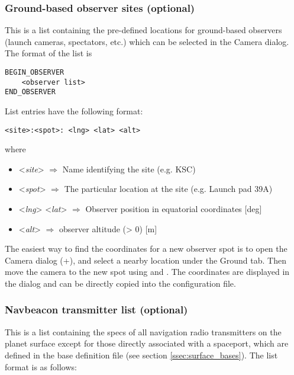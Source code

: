 \documentclass[Orbiter Developer Manual.tex]{subfiles}
\begin{document}
\subsubsection*{Ground-based observer sites (optional)}
This is a list containing the pre-defined locations for ground-based observers (launch cameras, spectators, etc.) which can be selected in the Camera dialog. The format of the list is

\begin{lstlisting}[language=OSFS]
BEGIN_OBSERVER
	<observer list>
END_OBSERVER
\end{lstlisting}

\noindent
List entries have the following format:

\begin{lstlisting}[language=OSFS]
<site>:<spot>: <lng> <lat> <alt>
\end{lstlisting}

\noindent
where

\begin{itemize}
\item <\textit{site}> $\Rightarrow$ Name identifying the site (e.g. KSC)
\item <\textit{spot}> $\Rightarrow$ The particular location at the site (e.g. Launch pad 39A)
\item <\textit{lng}> <\textit{lat}> $\Rightarrow$ Observer position in equatorial coordinates [deg]
\item <\textit{alt}> $\Rightarrow$ observer altitude (> 0) [m]
\end{itemize}

\noindent
The easiest way to find the coordinates for a new observer spot is to open the Camera dialog (\Ctrl+), and select a nearby location under the Ground tab. Then move the camera to the new spot using \Ctrl\DArrow\UArrow\RArrow\LArrow and . The coordinates are displayed in the dialog and can be directly copied into the configuration file.


\subsubsection*{Navbeacon transmitter list (optional)}
This is a list containing the specs of all navigation radio transmitters on the planet surface except for those directly associated with a spaceport, which are defined in the base definition file (see section \ref{ssec:surface_bases}). The list format is as follows:
\end{document}
